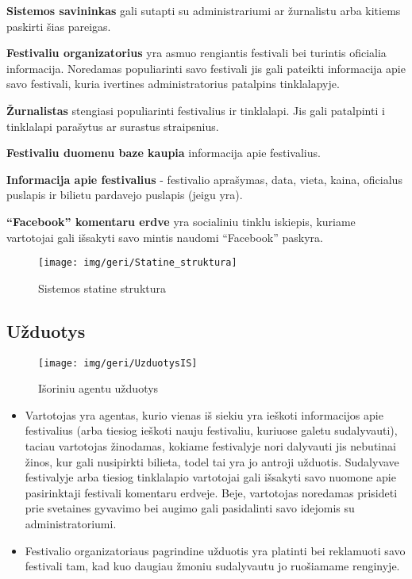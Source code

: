 ﻿\documentclass{VUMIFPSkursinis}
\begin{document}
{\textbf{Sistemos savininkas} gali sutapti su administrariumi ar žurnalistu arba kitiems paskirti šias pareigas.

\textbf{Festivaliu organizatorius} yra asmuo rengiantis festivali bei turintis oficialia informacija. Noredamas populiarinti savo festivali jis gali pateikti informacija apie savo festivali, kuria ivertines administratorius patalpins tinklalapyje.

\textbf{Žurnalistas} stengiasi populiarinti festivalius ir tinklalapi. Jis gali patalpinti i tinklalapi parašytus ar surastus straipsnius.

\textbf{Festivaliu duomenu baze kaupia} informacija apie festivalius.

\textbf{Informacija apie festivalius} - festivalio aprašymas, data, vieta, kaina, oficialus puslapis ir bilietu pardavejo puslapis (jeigu yra).

\textbf{“Facebook” komentaru erdve} yra socialiniu tinklu iskiepis, kuriame vartotojai gali išsakyti savo mintis naudomi “Facebook” paskyra.

\begin{figure}[H]
    \centering
    \texttt{[image: img/geri/Statine\_struktura]}
    \label{img:uml1}
	\caption{Sistemos statine struktura}
\end{figure}

\subsection {Užduotys}

\begin{figure}[H]
    \centering
    \texttt{[image: img/geri/UzduotysIS]}
    \label{img:uml2}
	\caption{Išoriniu agentu užduotys}
\end{figure}

\begin{itemize}
\item Vartotojas yra agentas, kurio vienas iš siekiu yra ieškoti informacijos apie festivalius (arba tiesiog ieškoti nauju festivaliu, kuriuose galetu sudalyvauti), taciau vartotojas žinodamas, kokiame festivalyje nori dalyvauti jis nebutinai žinos, kur gali nusipirkti bilieta, todel tai yra jo antroji užduotis. Sudalyvave festivalyje arba tiesiog tinklalapio vartotojai gali išsakyti savo nuomone apie pasirinktaji festivali komentaru erdveje. Beje, vartotojas noredamas prisideti prie svetaines gyvavimo bei augimo gali pasidalinti savo idejomis su administratoriumi.
\item Festivalio organizatoriaus pagrindine užduotis yra platinti bei reklamuoti savo festivali tam, kad kuo daugiau žmoniu sudalyvautu jo ruošiamame renginyje.
\end{itemize}

}
\end{document}
